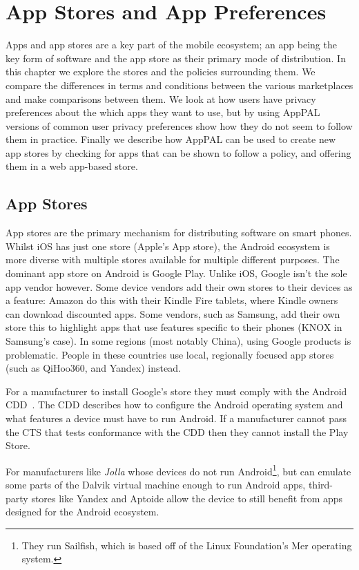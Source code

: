 \documentclass[thesis.tex]{subfiles}
\begin{document}
\chapter{App Stores and App Preferences}
\label{chap:apps-and-stores}

Apps and app stores are a key part of the mobile ecosystem; an app being the key
form of software and the app store as their primary mode of distribution. In
this chapter we explore the stores and the policies surrounding them. We compare
the differences in terms and conditions between the various marketplaces and
make comparisons between them. We look at how users have privacy preferences
about the which apps they want to use, but by using AppPAL versions of common
user privacy preferences show how they do not seem to follow them in practice.
Finally we describe how AppPAL can be used to create new app stores by checking
for apps that can be shown to follow a policy, and offering them in a web
app-based store.

\section{App Stores}

App stores are the primary mechanism for distributing software on smart phones.
Whilst iOS has just one store (Apple's App store), the Android ecosystem is more
diverse with multiple stores available for multiple different purposes. The
dominant app store on Android is Google Play. Unlike iOS, Google isn't the sole
app vendor however. Some device vendors add their own stores to their devices as
a feature: Amazon do this with their Kindle Fire tablets, where Kindle owners
can download discounted apps. Some vendors, such as Samsung, add their own store
this to highlight apps that use features specific to their phones (KNOX in
Samsung's case). In some regions (most notably China), using Google products is
problematic. People in these countries use local, regionally focused app stores
(such as QiHoo360, and Yandex) instead.

For a manufacturer to install Google's store they must comply with the Android
\ac{CDD}~\cite{google_android_2016}. The \ac{CDD} describes how to configure the
Android operating system and what features a device must have to run Android. If
a manufacturer cannot pass the \ac{CTS} that tests conformance with the \ac{CDD}
then they cannot install the Play Store.

For manufacturers like \emph{Jolla} whose devices do not run
Android\footnote{They run Sailfish, which is based off of the Linux Foundation's
Mer operating system.}, but can emulate some parts of the Dalvik virtual machine
enough to run Android apps, third-party stores like Yandex and Aptoide allow the
device to still benefit from apps designed for the Android ecosystem.
\end{document}

